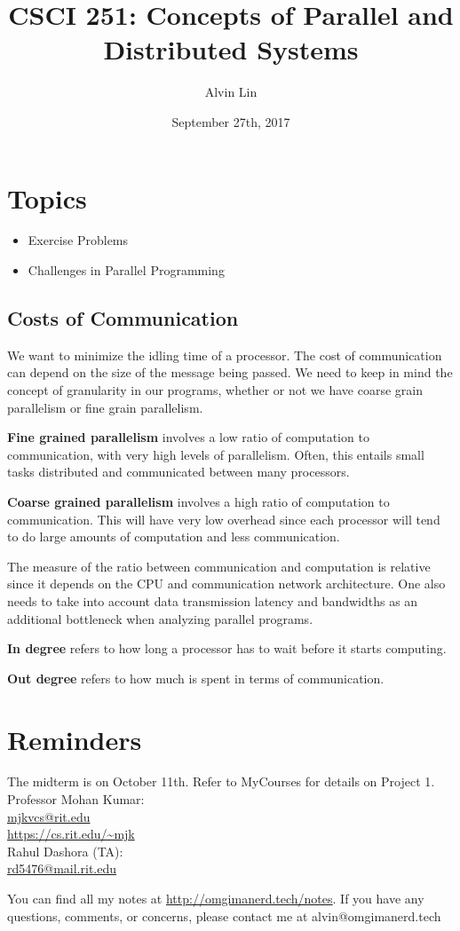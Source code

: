 \documentclass{math}
\title{CSCI 251: Concepts of Parallel and Distributed Systems}
\author{Alvin Lin}
\date{September 27th, 2017}
\begin{document}
\maketitle

\section*{Topics}
\begin{itemize}
  \item Exercise Problems
  \item Challenges in Parallel Programming
\end{itemize}

\subsection*{Costs of Communication}
We want to minimize the idling time of a processor. The cost of communication
can depend on the size of the message being passed. We need to keep in mind
the concept of granularity in our programs, whether or not we have coarse grain
parallelism or fine grain parallelism. \par
\textbf{Fine grained parallelism} involves a low ratio of computation to
communication, with very high levels of parallelism. Often, this entails small
tasks distributed and communicated between many processors. \par
\textbf{Coarse grained parallelism} involves a high ratio of computation to
communication. This will have very low overhead since each processor will tend
to do large amounts of computation and less communication. \par
The measure of the ratio between communication and computation is relative since
it depends on the CPU and communication network architecture. One also needs to
take into account data transmission latency and bandwidths as an additional
bottleneck when analyzing parallel programs. \par
\textbf{In degree} refers to how long a processor has to wait before it starts
computing. \par
\textbf{Out degree} refers to how much is spent in terms of communication.

\section*{Reminders}
The midterm is on October 11th.
Refer to MyCourses for details on Project 1. \\

\noindent Professor Mohan Kumar: \\
\url{mjkvcs@rit.edu} \\
\url{https://cs.rit.edu/~mjk} \\

\noindent Rahul Dashora (TA): \\
\url{rd5476@mail.rit.edu} \\

\begin{center}
  You can find all my notes at \url{http://omgimanerd.tech/notes}. If you have
  any questions, comments, or concerns, please contact me at
  alvin@omgimanerd.tech
\end{center}
\end{document}
